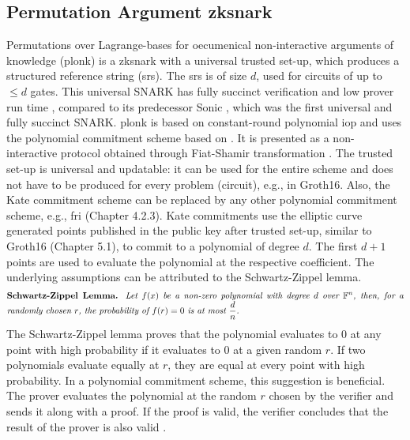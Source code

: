 \subsection{Permutation Argument \acrshort{zksnark}}
Permutations over Lagrange-bases for oecumenical non-interactive arguments of knowledge (\acrshort{plonk}) is a \acrshort{zksnark} with a universal trusted set-up, which produces a structured reference string (\acrshort{srs}). The \acrshort{srs} is of size \(d\), used for circuits of up to \(\leq d\) gates. This universal SNARK has fully succinct verification and low prover run time \citep{PLONKcryptoeprint:2019/953}, compared to its predecessor Sonic \citep{SONIC10.1145/3319535.3339817}, which was the first universal and fully succinct SNARK. \acrshort{plonk} is based on constant-round polynomial \acrshort{iop} and uses the polynomial commitment scheme based on \citet{Kate2010ConstantSizeCT}. It is presented as a non-interactive protocol obtained through Fiat-Shamir transformation \citep{PLONKcryptoeprint:2019/953}. The trusted set-up is universal and updatable: it can be used for the entire scheme and does not have to be produced for every problem (circuit), e.g., in Groth16. Also, the Kate commitment scheme can be replaced by any other polynomial commitment scheme, e.g., \acrshort{fri} (Chapter 4.2.3). 
Kate commitments use the elliptic curve generated points published in the public key after trusted set-up, similar to Groth16 (Chapter 5.1), to commit to a polynomial of degree \(d\). The first \(d+1\) points are used to evaluate the polynomial at the respective coefficient. The underlying assumptions can be attributed to the Schwartz-Zippel lemma.
\begin{align*}
    \text{\parbox{450pt}{\textbf{Schwartz-Zippel Lemma.} \textit{Let \(f(x)\) be a non-zero polynomial with degree \(d\) over \begin{math}\mathbb{F}^n\end{math}, then, for a randomly chosen \(r\), the probability of \(f(r) = 0\) is at most \(\frac{d}{n}\).}}}
\end{align*}
The Schwartz-Zippel lemma proves that the polynomial evaluates to 0 at any point with high probability if it evaluates to 0 at a given random \(r\). If two polynomials evaluate equally at \(r\), they are equal at every point with high probability. In a polynomial commitment scheme, this suggestion is beneficial. The prover evaluates the polynomial at the random \(r\) chosen by the verifier and sends it along with a proof. If the proof is valid, the verifier concludes that the result of the prover is also valid \citep{Kate2010ConstantSizeCT}.

